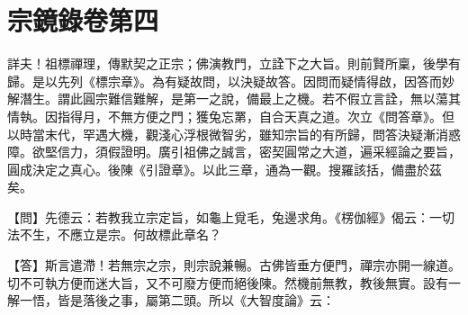 
% 

\chapter{宗鏡錄卷第四}

詳夫！祖標禪理，傳默契之正宗；佛演教門，立詮下之大旨。則前賢所稟，後學有歸。是以先列《標宗章》。為有疑故問，以決疑故答。因問而疑情得啟，因答而妙解潛生。謂此圓宗難信難解，是第一之說，備最上之機。若不假立言詮，無以蕩其情執。因指得月，不無方便之門；獲兔忘罤，自合天真之道。次立《問答章》。但以時當末代，罕遇大機，觀淺心浮根微智劣，雖知宗旨的有所歸，問答決疑漸消惑障。欲堅信力，須假證明。廣引祖佛之誠言，密契圓常之大道，遍采經論之要旨，圓成決定之真心。後陳《引證章》。以此三章，通為一觀。搜羅該括，備盡於茲矣。 


{\heiti 【問】先德云：若教我立宗定旨，如龜上覓毛，兔邊求角。《楞伽經》偈云：一切法不生，不應立是宗。何故標此章名？}

【答】斯言遣滯！若無宗之宗，則宗說兼暢。古佛皆垂方便門，禪宗亦開一線道。切不可執方便而迷大旨，又不可廢方便而絕後陳。然機前無教，教後無實。設有一解一悟，皆是落後之事，屬第二頭。所以《大智度論》云：

